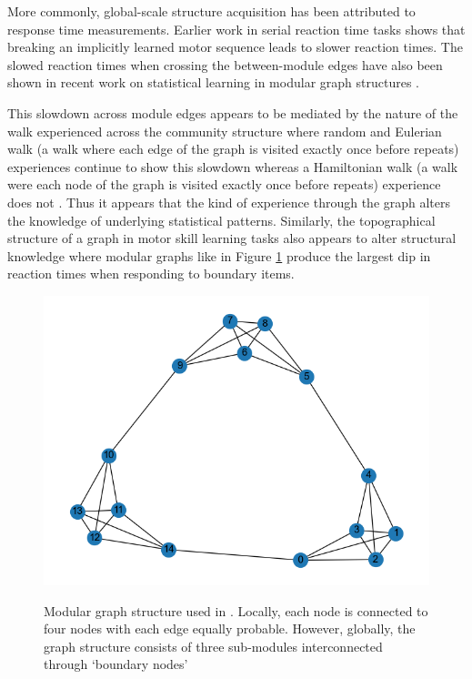 More commonly, global-scale structure acquisition has been attributed to response time measurements. Earlier work in serial reaction time tasks \cite{nissen1987attentional, cleeremans1991learning} shows that breaking an implicitly learned motor sequence leads to slower reaction times. The slowed reaction times when crossing the between-module edges have also been shown in recent work on statistical learning in modular graph structures \cite{kahn2018network, lynn2020humans, karuza2017process, karuza2022value, karuza2019human, lynn2020human}. 

This slowdown across module edges appears to be mediated by the nature of the walk experienced across the community structure where random and Eulerian walk (a walk where each edge of the graph is visited exactly once before repeats) experiences continue to show this slowdown whereas a Hamiltonian walk (a walk were each node of the graph is visited exactly once before repeats) experience does not \cite{karuza2017process}. Thus it appears that the kind of experience through the graph alters the knowledge of underlying statistical patterns. Similarly, the topographical structure of a graph in motor skill learning tasks also appears to alter structural knowledge \cite{lynn2020abstract, lynn2020human, lynn2020humans} where modular graphs like in Figure \ref{fig:modular_graph} produce the largest dip in reaction times when responding to boundary items.

\begin{figure}
	\centering
	\caption{Modular graph structure used in \cite{schapiro2013neural}. Locally, each node is connected to four nodes with each edge equally probable. However, globally, the graph structure consists of three sub-modules interconnected through `boundary nodes'}
	\includegraphics[width = \textwidth]{chapter_notebooks/chapter_2/figures/modular_graph.png}
	\label{fig:modular_graph}
\end{figure}

